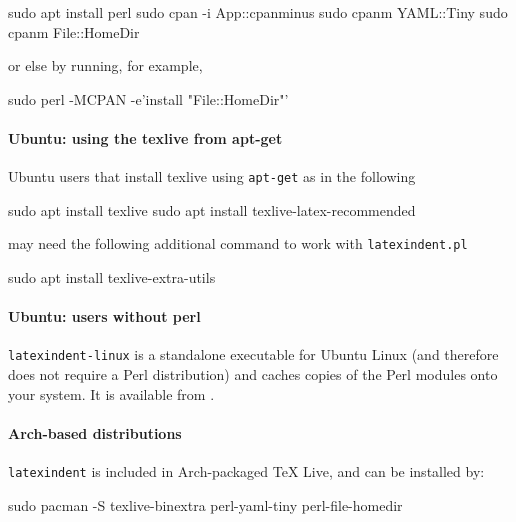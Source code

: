 \documentclass[10pt]{article}
\begin{document}
   \begin{commandshell}
sudo apt install perl
sudo cpan -i App::cpanminus
sudo cpanm YAML::Tiny
sudo cpanm File::HomeDir
\end{commandshell}

   or else by running, for example,

   \begin{commandshell}
sudo perl -MCPAN -e'install "File::HomeDir"'
\end{commandshell}

  \paragraph{Ubuntu: using the texlive from apt-get}
   Ubuntu users that install texlive using \texttt{apt-get} as in the following

   \begin{commandshell}
sudo apt install texlive
sudo apt install texlive-latex-recommended
\end{commandshell}

   may need the following additional command to work with \texttt{latexindent.pl}

   \begin{commandshell}
sudo apt install texlive-extra-utils
\end{commandshell}

  \paragraph{Ubuntu: users without perl}

   \texttt{latexindent-linux} is a standalone executable  for Ubuntu Linux (and therefore does not require a Perl distribution)
   and caches copies of the Perl modules onto your system. It is available from \cite{latexindent-home}.
     

  \paragraph{Arch-based distributions}
   \texttt{latexindent} is included in Arch-packaged TeX Live, and can be installed by:

   \begin{commandshell}
sudo pacman -S texlive-binextra perl-yaml-tiny perl-file-homedir
\end{commandshell}
\end{document}

